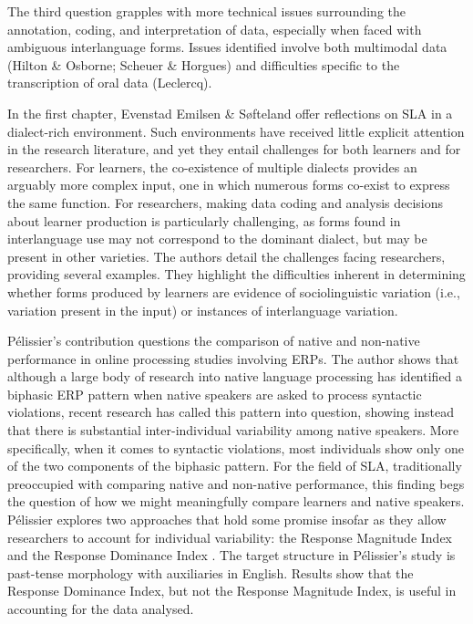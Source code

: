 \documentclass[output=paper]{../langscibook}
\begin{document}
{The third question grapples with more technical issues surrounding the annotation, coding, and interpretation of data,} especially when faced with ambiguous interlanguage forms.{ Issues identified involve both multimodal data (Hilton \& Osborne; Scheuer \& Horgues) and difficulties specific to the transcription of oral data (Leclercq).}


{In the first chapter,} {{Evenstad Emilsen \& Søfteland offer reflections on SLA in a dialect-rich environment. Such environments have received little explicit attention in the research literature, and yet they entail challenges for both learners and for researchers. For learners, the co-existence of multiple dialects provides an arguably more complex input, one in which numerous forms co-exist to express the same function. For researchers, making data coding and analysis decisions about learner production is particularly challenging, as forms found in interlanguage use may not correspond to the dominant dialect, but may be present in other varieties. The authors detail the challenges facing researchers, providing several examples. They highlight the difficulties inherent in determining whether forms produced by learners are evidence of sociolinguistic variation (i.e., variation present in the input) or instances of interlanguage variation.} }

{{Pélissier’s contribution questions the comparison of native and non-native performance in online processing studies involving ERPs. The author shows that although a large body of research into native language processing has identified a biphasic ERP pattern when native speakers are asked to process syntactic violations, recent research has called this pattern into question, showing instead that there is substantial inter-individual variability among native speakers. More specifically, when it comes to syntactic violations, most individuals show only one of the two components of the biphasic pattern. For the field of SLA, traditionally preoccupied with comparing native and non-native performance, this finding begs the question of how we might meaningfully compare learners and native speakers. Pélissier explores two approaches that hold some promise insofar as they allow researchers to account for individual variability: the Response Magnitude Index and the Response Dominance Index \citep{TannerEtAl2014}. The target structure in Pélissier’s study is past-tense morphology with auxiliaries in English. Results show that the Response Dominance Index, but not the Response Magnitude Index, is useful in accounting for the data analysed.}}
\end{document}
